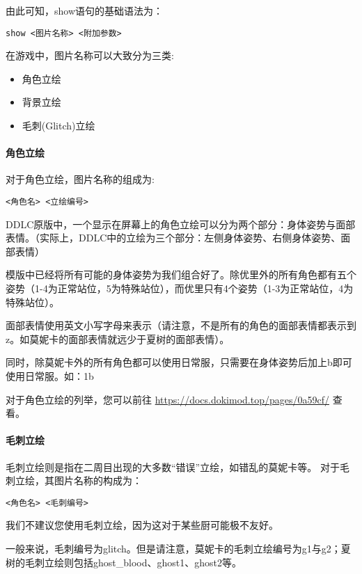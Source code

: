 由此可知，show语句的基础语法为：
\begin{lstlisting}[numbers=none]
show <图片名称> <附加参数>
\end{lstlisting}

在游戏中，图片名称可以大致分为三类:
\begin{itemize}
    \item 角色立绘
    \item 背景立绘
    \item 毛刺(Glitch)立绘
\end{itemize}

\paragraph{角色立绘}\label{para:3.2.2.1}

对于角色立绘，图片名称的组成为:
\begin{lstlisting}[numbers=none]
<角色名> <立绘编号>
\end{lstlisting}

DDLC原版中，一个显示在屏幕上的角色立绘可以分为两个部分：身体姿势与面部表情。（实际上，DDLC中的立绘为三个部分：左侧身体姿势、右侧身体姿势、面部表情）

模版中已经将所有可能的身体姿势为我们组合好了。除优里外的所有角色都有五个姿势（1-4为正常站位，5为特殊站位），而优里只有4个姿势（1-3为正常站位，4为特殊站位）。

面部表情使用英文小写字母来表示（请注意，不是所有的角色的面部表情都表示到z。如莫妮卡的面部表情就远少于夏树的面部表情）。

同时，除莫妮卡外的所有角色都可以使用日常服，只需要在身体姿势后加上b即可使用日常服。如：1b

对于角色立绘的列举，您可以前往 \url{https://docs.dokimod.top/pages/0a59cf/} 查看。


\paragraph{毛刺立绘}

毛刺立绘则是指在二周目出现的大多数“错误”立绘，如错乱的莫妮卡等。
对于毛刺立绘，其图片名称的构成为：
\begin{lstlisting}[numbers=none]
<角色名> <毛刺编号>
\end{lstlisting}

\begin{Warning}
    我们不建议您使用毛刺立绘，因为这对于某些厨可能极不友好。
\end{Warning}

一般来说，毛刺编号为glitch。但是请注意，莫妮卡的毛刺立绘编号为g1与g2；夏树的毛刺立绘则包括ghost\_blood、ghost1、ghost2等。

